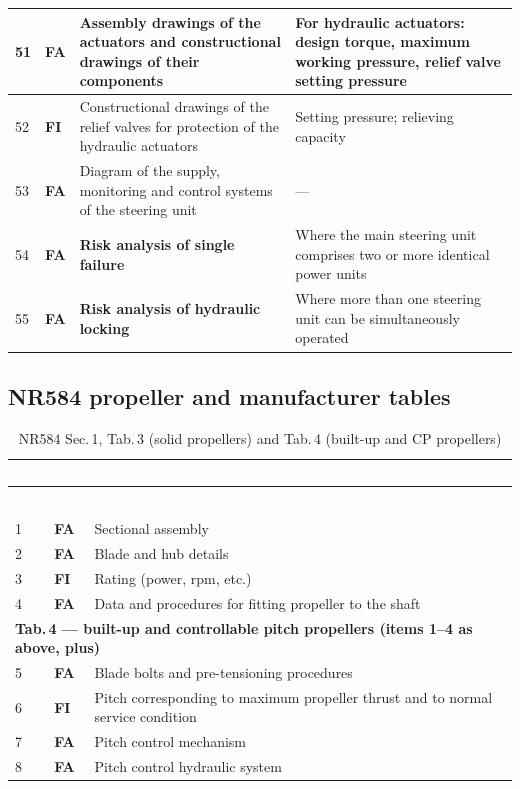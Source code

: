 \documentclass[11pt,a4paper]{report}
\newcommand{\fa}{\textbf{\textcolor{warningred}{FA}}}
\newcommand{\fic}{\textbf{\textcolor{bvgray}{FI}}}
\begin{document}
\begin{longtable}{|p{0.7cm}|p{1.1cm}|p{6.0cm}|p{6.2cm}|}
\hline
51 & \fa{} & Assembly drawings of the actuators and constructional drawings of their components & For hydraulic actuators: design torque, maximum working pressure, relief valve setting pressure \\
\hline
52 & \fic{} & Constructional drawings of the relief valves for protection of the hydraulic actuators & Setting pressure; relieving capacity \\
\hline
53 & \fa{} & Diagram of the supply, monitoring and control systems of the steering unit & --- \\
\hline
54 & \fa{} & \textbf{Risk analysis of single failure} & Where the main steering unit comprises two or more identical power units \\
\hline
55 & \fa{} & \textbf{Risk analysis of hydraulic locking} & Where more than one steering unit can be simultaneously operated \\
\hline
\end{longtable}

\subsection{NR584 propeller and manufacturer tables}

\begin{longtable}{|p{0.7cm}|p{1.1cm}|p{12.6cm}|}
\caption{NR584 Sec.\,1, Tab.\,3 (solid propellers) and Tab.\,4 (built-up and CP propellers)} \label{tab:nr584prop} \\
\hline
\rowcolor{bvblue}
\textcolor{white}{\textbf{No.}} & \textcolor{white}{\textbf{A/I}} & \textcolor{white}{\textbf{Documentation}} \\
\hline
\endfirsthead
\hline
\rowcolor{bvblue}
\textcolor{white}{\textbf{No.}} & \textcolor{white}{\textbf{A/I}} & \textcolor{white}{\textbf{Documentation}} \\
\hline
\endhead
\hline
\endlastfoot
\multicolumn{3}{|l|}{\cellcolor{lightgray}\textbf{Tab.\,3 --- solid propellers}} \\
\hline
1 & \fa{} & Sectional assembly \\
\hline
2 & \fa{} & Blade and hub details \\
\hline
3 & \fic{} & Rating (power, rpm, etc.) \\
\hline
4 & \fa{} & Data and procedures for fitting propeller to the shaft \\
\hline
\multicolumn{3}{|l|}{\cellcolor{lightgray}\textbf{Tab.\,4 --- built-up and controllable pitch propellers (items 1--4 as above, plus)}} \\
\hline
5 & \fa{} & Blade bolts and pre-tensioning procedures \\
\hline
6 & \fic{} & Pitch corresponding to maximum propeller thrust and to normal service condition \\
\hline
7 & \fa{} & Pitch control mechanism \\
\hline
8 & \fa{} & Pitch control hydraulic system \\
\hline
\end{longtable}
\end{document}
